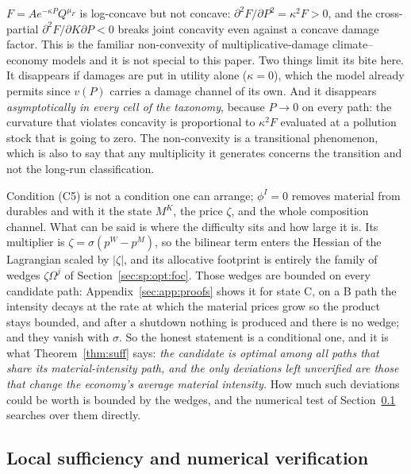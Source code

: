  $F=A e^{-\kappa P}Q^{\mu_F}$ is log-concave but not concave: $\partial^2F/\partial P^2=\kappa^2F>0$, and the cross-partial $\partial^2F/\partial K\partial P<0$ breaks joint concavity even against a concave damage factor. This is the familiar non-convexity of multiplicative-damage climate--economy models and it is not special to this paper. Two things limit its bite here. It disappears if damages are put in utility alone ($\kappa=0$), which the model already permits since $v\left(P\right)$ carries a damage channel of its own. And it disappears \emph{asymptotically in every cell of the taxonomy}, because $P\to0$ on every path: the curvature that violates concavity is proportional to $\kappa^2F$ evaluated at a pollution stock that is going to zero. The non-convexity is a transitional phenomenon, which is also to say that any multiplicity it generates concerns the transition and not the long-run classification.

 Condition (C5) is not a condition one can arrange; $\phi^I=0$ removes material from durables and with it the state $M^K$, the price $\zeta$, and the whole composition channel. What can be said is where the difficulty sits and how large it is. Its multiplier is $\zeta=\sigma\left(p^W-p^M\right)$, so the bilinear term enters the Hessian of the Lagrangian scaled by $\left|\zeta\right|$, and its allocative footprint is entirely the family of wedges $\zeta\Omega^j$ of Section~\ref{sec:sp:opt:foc}. Those wedges are bounded on every candidate path: Appendix~\ref{sec:app:proofs} shows it for state C, on a B path the intensity decays at the rate at which the material prices grow so the product stays bounded, and after a shutdown nothing is produced and there is no wedge; and they vanish with $\sigma$. So the honest statement is a conditional one, and it is what Theorem~\ref{thm:suff} says: \emph{the candidate is optimal among all paths that share its material-intensity path, and the only deviations left unverified are those that change the economy's average material intensity.} How much such deviations could be worth is bounded by the wedges, and the numerical test of Section~\ref{sec:app:suff:numerical} searches over them directly.

\subsection{Local sufficiency and numerical verification}\label{sec:app:suff:numerical}

